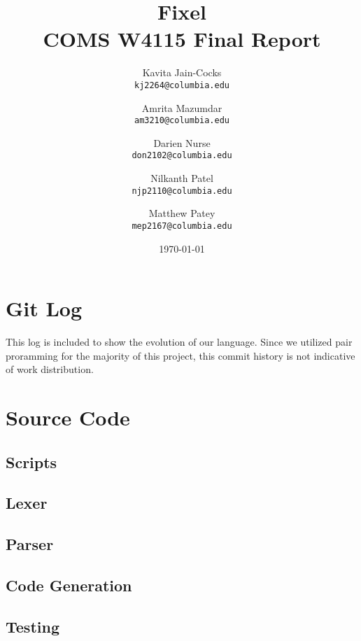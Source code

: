 \documentclass{article}
\title{Fixel \\
COMS W4115 Final Report}
\author{
  Kavita Jain-Cocks\\
  \texttt{kj2264@columbia.edu}
  \and
  Amrita Mazumdar\\
  \texttt{am3210@columbia.edu}
  \and
  Darien Nurse\\
  \texttt{don2102@columbia.edu}
  \and
  Nilkanth Patel\\
  \texttt{njp2110@columbia.edu}
  \and
  Matthew Patey\\
  \texttt{mep2167@columbia.edu}
   \\}
\date{\today}
\begin{document}
\maketitle
\newpage
\tableofcontents
\newpage










\newpage
\appendix
\section{Git Log}
This log is included to show the evolution of our language.  Since we utilized pair proramming for the majority of this project, this commit history is not indicative of work distribution.


\section{Source Code}
	\subsection{Scripts}
		
		
		
		
    \subsection{Lexer}
         
    \subsection{Parser}
        
    \subsection{Code Generation}
        
        
        
    \subsection{Testing}
        
        
        
        
        
        
\end{document}
